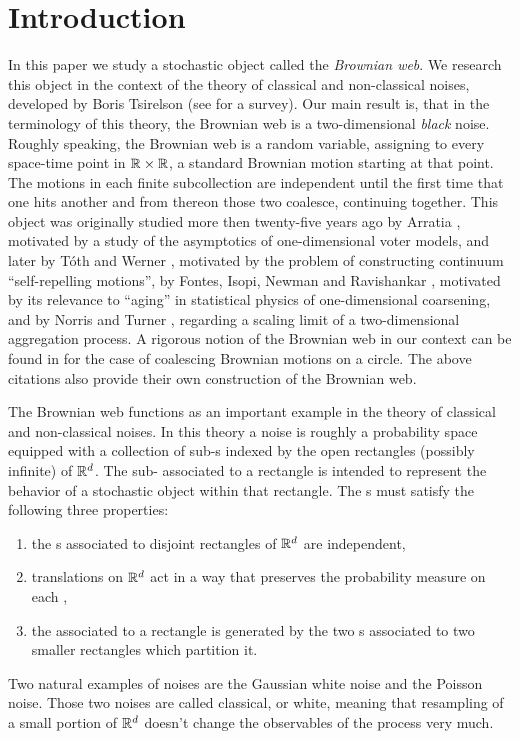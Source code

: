 {\section{Introduction}
In this paper we study a stochastic object called the \emph{Brownian web}. We
research this object in the context of the theory of classical and
non-classical noises, developed by Boris Tsirelson
(see \cite{tsirelson-nonclassical-stochastic-flows} for a survey).
Our main result
is, that in the terminology of this theory, the Brownian web is a
two-dimensional \emph{black} noise.
Roughly speaking, the Brownian web is a random variable, assigning to
every space-time point in $\mathbb{R}\times\mathbb{R}$, a standard Brownian motion starting
at that point.  The motions in each finite subcollection are independent
until the first time that one hits another
and from thereon those two coalesce, continuing together. This object was
originally studied more then twenty-five years ago by Arratia \cite{arratia}, motivated
by a study of the asymptotics of one-dimensional voter models, and later
by T\'{o}th and Werner \cite{toth-werner},
motivated by the problem of constructing continuum
``self-repelling motions'', by Fontes, Isopi, Newman and Ravishankar
\cite{fontes-et-al},
motivated by its relevance to ``aging'' in statistical physics of
one-dimensional coarsening, and by Norris and Turner
\cite{norris-turner-convergence-to-bw},\cite{norris-turner-planar-aggregation}
regarding a scaling limit of a two-dimensional aggregation process.
A rigorous notion of the Brownian web in our context
can be found in \cite{tsirelson-lecture-course} for the case of coalescing
Brownian motions on a circle.  The above citations also provide
their own construction of the Brownian web.

The Brownian web functions as an important example in the theory of
classical and non-classical noises. In this
theory a noise is roughly a probability space equipped with a collection
of sub-\sigfield{}s indexed by the open rectangles (possibly infinite) of
$\mathbb{R}^d$.  The sub-\sigfield{} associated to a rectangle is intended to
represent the behavior of a stochastic object within that rectangle.
The \sigfield{}s must satisfy the following three properties:
\begin{enumerate}
\item the \sigfield{}s associated to disjoint rectangles of $\mathbb{R}^d$ are
independent,
\item translations on $\mathbb{R}^d$ act in a way that preserves the
probability measure on each \sigfield{},
\item the \sigfield{}
associated to a rectangle is generated by the two \sigfield{}s
associated to two smaller rectangles which partition it.
\end{enumerate}
Two natural examples of noises are the Gaussian white noise
and the Poisson noise. Those two noises are called classical, or white,
meaning that
resampling of a small portion of $\mathbb{R}^d$ doesn't change the observables of the
process very much.

}
